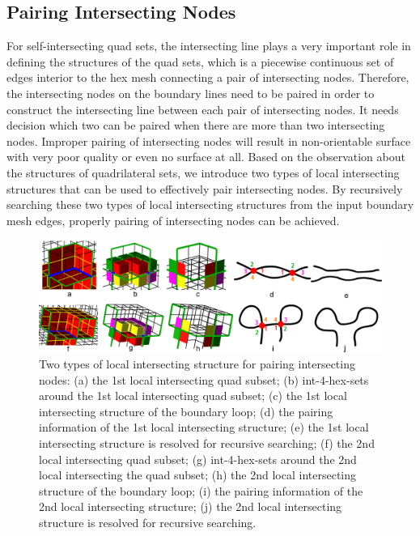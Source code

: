 \documentclass[final,5p,times,twocolumn]{elsarticle}
\begin{document}
\subsection{Pairing Intersecting Nodes}
\label{sec:int_pt_pair}
For self-intersecting quad sets, the intersecting line plays a very important role in defining the structures of the quad sets, which is a piecewise continuous set of edges interior to the hex mesh connecting a pair of intersecting nodes. Therefore, the intersecting nodes on the boundary lines need to be paired in order to construct the intersecting line between each pair of intersecting nodes. It needs decision which two can be paired when there are more than two intersecting nodes. Improper pairing of intersecting nodes will result in non-orientable surface with very poor quality or even no surface at all\cite{Suzuki:2010hn}. Based on the observation about the structures of quadrilateral sets, we introduce two types of local intersecting structures that can be used to effectively pair intersecting nodes. By recursively searching these two types of local intersecting structures from the input boundary mesh edges, properly pairing of intersecting nodes can be achieved.

\begin{figure}[htbp]
\begin{center}
\includegraphics[width=17cm]{figures/pair_patterns.png}
\caption{Two types of local intersecting structure for pairing intersecting nodes: (a) the 1st local intersecting quad subset; (b) int-4-hex-sets around the 1st local intersecting quad subset; (c) the 1st local intersecting structure of the boundary loop; (d) the pairing information of the 1st local intersecting structure; (e) the 1st local intersecting structure is resolved for recursive searching; (f) the 2nd local intersecting quad subset; (g) int-4-hex-sets around the 2nd local intersecting the quad subset; (h) the 2nd local intersecting structure of the boundary loop; (i) the pairing information of the 2nd local intersecting structure; (j) the 2nd local intersecting structure is resolved for recursive searching.}
\label{fig:int_pair_tpl}
\end{center}
\end{figure}
\end{document}
